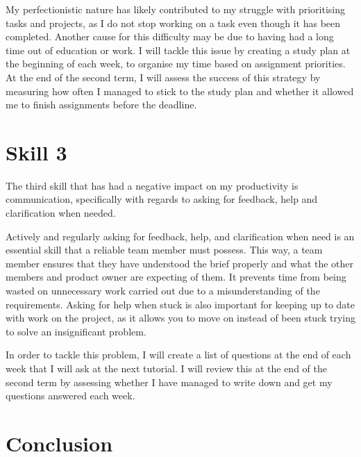 \documentclass{scrartcl}
\begin{document}
My perfectionistic nature has likely contributed to my struggle with prioritising tasks and projects, as I do not stop working on a task even though it has been completed. Another cause for this difficulty may be due to having had a long time out of education or work. I will tackle this issue by creating a study plan at the beginning of each week, to organise my time based on assignment priorities. At the end of the second term, I will assess the success of this strategy by measuring how often I managed to stick to the study plan and whether it allowed me to finish assignments before the deadline.

\section{Skill 3}
The third skill that has had a negative impact on my productivity is communication, specifically with regards to asking for feedback, help and clarification when needed.

Actively and regularly asking for feedback, help, and clarification when need is an essential skill that a reliable team member must possess. This way, a team member ensures that they have understood the brief properly and what the other members and product owner are expecting of them. It prevents time from being wasted on unnecessary work carried out due to a misunderstanding of the requirements. Asking for help when stuck is also important for keeping up to date with work on the project, as it allows you to move on instead of been stuck trying to solve an insignificant problem.

In order to tackle this problem, I will create a list of questions at the end of each week that I will ask at the next tutorial. I will review this at the end of the second term by assessing whether I have managed to write down and get my questions answered each week. 

\section{Conclusion}



\end{document}
